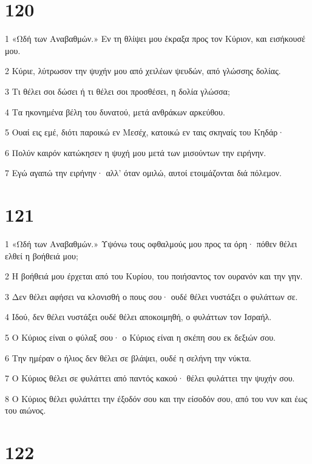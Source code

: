 \chapter{120}

\par 1 «Ωδή των Αναβαθμών.» Εν τη θλίψει μου έκραξα προς τον Κύριον, και εισήκουσέ μου.
\par 2 Κύριε, λύτρωσον την ψυχήν μου από χειλέων ψευδών, από γλώσσης δολίας.
\par 3 Τι θέλει σοι δώσει ή τι θέλει σοι προσθέσει, η δολία γλώσσα;
\par 4 Τα ηκονημένα βέλη του δυνατού, μετά ανθράκων αρκεύθου.
\par 5 Ουαί εις εμέ, διότι παροικώ εν Μεσέχ, κατοικώ εν ταις σκηναίς του Κηδάρ·
\par 6 Πολύν καιρόν κατώκησεν η ψυχή μου μετά των μισούντων την ειρήνην.
\par 7 Εγώ αγαπώ την ειρήνην· αλλ' όταν ομιλώ, αυτοί ετοιμάζονται διά πόλεμον.

\chapter{121}

\par 1 «Ωδή των Αναβαθμών.» Υψόνω τους οφθαλμούς μου προς τα όρη· πόθεν θέλει ελθεί η βοήθειά μου;
\par 2 Η βοήθειά μου έρχεται από του Κυρίου, του ποιήσαντος τον ουρανόν και την γην.
\par 3 Δεν θέλει αφήσει να κλονισθή ο πους σου· ουδέ θέλει νυστάξει ο φυλάττων σε.
\par 4 Ιδού, δεν θέλει νυστάξει ουδέ θέλει αποκοιμηθή, ο φυλάττων τον Ισραήλ.
\par 5 Ο Κύριος είναι ο φύλαξ σου· ο Κύριος είναι η σκέπη σου εκ δεξιών σου.
\par 6 Την ημέραν ο ήλιος δεν θέλει σε βλάψει, ουδέ η σελήνη την νύκτα.
\par 7 Ο Κύριος θέλει σε φυλάττει από παντός κακού· θέλει φυλάττει την ψυχήν σου.
\par 8 Ο Κύριος θέλει φυλάττει την έξοδόν σου και την είσοδόν σου, από του νυν και έως του αιώνος.

\chapter{122}

